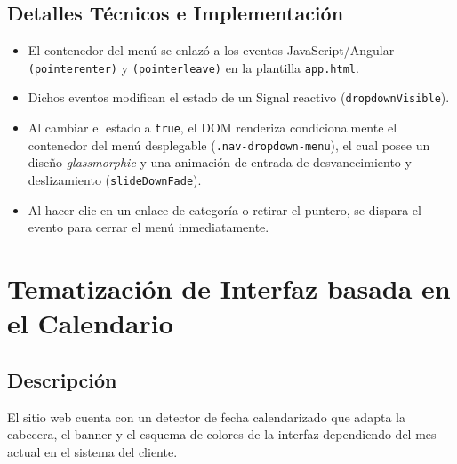 \documentclass[11pt,a4paper]{article}
\begin{document}
\subsection{Detalles Técnicos e Implementación}
\begin{itemize}
    \item El contenedor del menú se enlazó a los eventos JavaScript/Angular \texttt{(pointerenter)} y \texttt{(pointerleave)} en la plantilla \texttt{app.html}.
    \item Dichos eventos modifican el estado de un Signal reactivo (\texttt{dropdownVisible}).
    \item Al cambiar el estado a \texttt{true}, el DOM renderiza condicionalmente el contenedor del menú desplegable (\texttt{.nav-dropdown-menu}), el cual posee un diseño \textit{glassmorphic} y una animación de entrada de desvanecimiento y deslizamiento (\texttt{slideDownFade}).
    \item Al hacer clic en un enlace de categoría o retirar el puntero, se dispara el evento para cerrar el menú inmediatamente.
\end{itemize}

\section{Tematización de Interfaz basada en el Calendario}

\subsection{Descripción}
El sitio web cuenta con un detector de fecha calendarizado que adapta la cabecera, el banner y el esquema de colores de la interfaz dependiendo del mes actual en el sistema del cliente.
\end{document}
